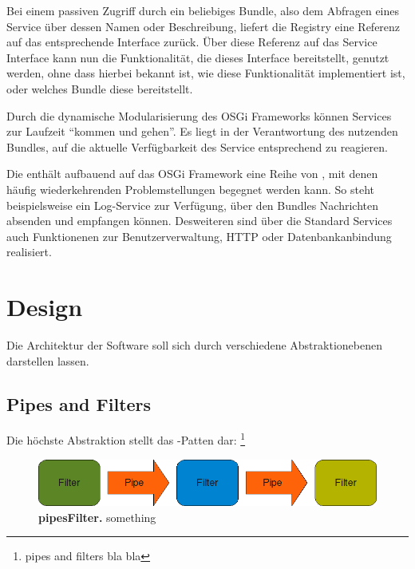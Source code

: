 Bei einem passiven Zugriff durch ein beliebiges Bundle, also dem Abfragen eines
Service über dessen Namen oder Beschreibung, liefert die Registry eine
Referenz auf das entsprechende Interface zurück.
Über diese Referenz auf das Service Interface kann nun die Funktionalität, die
dieses Interface bereitstellt, genutzt werden, ohne dass hierbei bekannt ist,
wie diese Funktionalität implementiert ist, oder welches Bundle diese
bereitstellt.

Durch die dynamische Modularisierung des OSGi Frameworks können Services zur
Laufzeit \enquote{kommen und gehen}. Es liegt in der Verantwortung des
nutzenden Bundles, auf die aktuelle Verfügbarkeit des Service entsprechend zu
reagieren.

Die  enthält aufbauend auf das OSGi Framework eine
Reihe von , mit denen häufig wiederkehrenden
Problemstellungen begegnet werden kann. So steht beispielsweise ein Log-Service
zur Verfügung, über den Bundles Nachrichten absenden und empfangen können.
Desweiteren sind über die Standard Services auch Funktionenen zur
Benutzerverwaltung, HTTP oder Datenbankanbindung realisiert.
\citep{wtherich_die_2008}

\section{Design}
Die Architektur der Software soll sich durch verschiedene Abstraktionebenen
darstellen lassen. 

\subsection{Pipes and Filters}
Die höchste Abstraktion stellt das -Patten dar:
\footnote{pipes and filters bla bla}

\begin{figure}[htbp]
	\begin{center}
		\includegraphics[scale=0.7]{pics/pipesFilter3.png}
	\caption[Pipes and Filter]{
	\textbf{pipesFilter.}
	something}
	\end{center}
	\label{fig:pipesFilter}
\end{figure}

